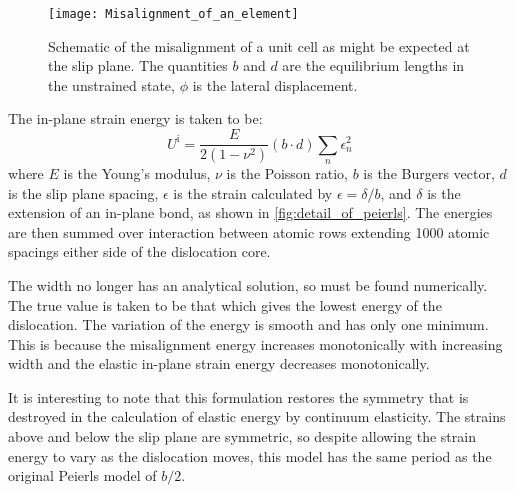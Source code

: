 \begin{figure}
\centering
\texttt{[image: Misalignment\_of\_an\_element]}
\captionsetup{width=0.5\textwidth}
\caption[Schematic of a misaligned unit cell]{Schematic of the misalignment of a unit cell as might be expected at the slip plane. The quantities $b$ and $d$ are the equilibrium lengths in the unstrained state, $\phi$ is the lateral displacement. \label{fig:schematic_misalignment}}
\end{figure}

The in-plane strain energy is taken to be:
\begin{equation}
U^{\text{i}} = \frac{E}{2(1-\nu^2)} (b\cdot d) \sum_n \epsilon_n^2
\end{equation}
where $E$ is the Young's modulus, $\nu$ is the Poisson ratio, $b$ is the Burgers vector, $d$ is the slip plane spacing, $\epsilon$ is the strain calculated by $\epsilon = \delta/b$, and $\delta$ is the extension of an in-plane bond, as shown in \autoref{fig:detail_of_peierls}. The energies are then summed over interaction between atomic rows extending 1000 atomic spacings either side of the dislocation core.

The width no longer has an analytical solution, so must be found numerically. The true value is taken to be that which gives the lowest energy of the dislocation. The variation of the energy is smooth and has only one minimum. This is because the misalignment energy increases monotonically with increasing width and the elastic in-plane strain energy decreases  monotonically.

It is interesting to note that this formulation restores the symmetry that is destroyed in the calculation of elastic energy by continuum elasticity. The strains above and below the slip plane are symmetric, so despite allowing the strain energy to vary as the dislocation moves, this model has the same period as the original Peierls model of $b/2$.




